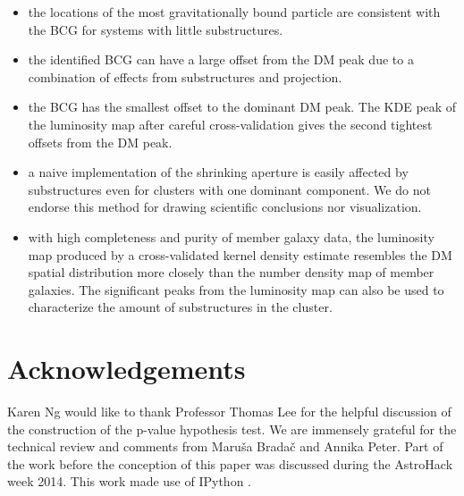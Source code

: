 \begin{itemize}
		\item the locations of the most gravitationally bound particle are consistent 
			with the BCG for systems with little substructures.  \\

		\item the identified BCG can have a large offset from the DM peak due to a
			combination of effects from substructures and projection. \\

		\item the BCG has the smallest offset to the dominant DM peak.  
			The KDE peak of the luminosity map after careful cross-validation 
			gives the second tightest offsets from the DM peak.  \\
		
		\item a naive implementation of the shrinking aperture is easily affected 
			by substructures even for clusters with one
			dominant component. We do not endorse this method for drawing scientific
			conclusions nor visualization.\\  

		\item with high completeness and purity of member galaxy data, the
			luminosity map produced by a cross-validated kernel density estimate 
			resembles the DM spatial distribution more closely than 
			the number density map of member galaxies. The significant peaks from the 
			luminosity map can also be used to characterize the amount of substructures in
			the cluster.\\ 
		
\end{itemize}


\section{Acknowledgements}
Karen Ng would like to thank Professor Thomas Lee for the helpful discussion of 
the construction of the p-value hypothesis test. We are immensely grateful for 
the technical review and comments from Maru\v{s}a Brada\v{c} and Annika Peter.  
Part of the work before the conception of this paper was discussed during 
the AstroHack week 2014. This work made use of {\sc IPython}
\citep{Perez2007}.
